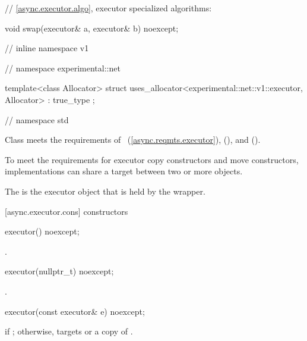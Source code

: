 \begin{codeblock}
{{{  // \ref{async.executor.algo}, executor specialized algorithms:

  void swap(executor& a, executor& b) noexcept;

} // inline namespace v1
} // namespace experimental::net

  template<class Allocator>
    struct uses_allocator<experimental::net::v1::executor, Allocator>
      : true_type {};

} // namespace std
\end{codeblock}

\pnum
Class  meets the requirements of ~(\ref{async.reqmts.executor}),  (), and  ().

\pnum
\begin{note} To meet the  requirements for executor copy constructors and move constructors, implementations can share a target between two or more  objects. \end{note}

\pnum
The  is the executor object that is held by the wrapper.


[async.executor.cons]{ constructors}

%
\begin{itemdecl}
executor() noexcept;
\end{itemdecl}

\begin{itemdescr}
\pnum
\postconditions {}.
\end{itemdescr}

%
\begin{itemdecl}
executor(nullptr_t) noexcept;
\end{itemdecl}

\begin{itemdescr}
\pnum
\postconditions {}.
\end{itemdescr}

%
\begin{itemdecl}
executor(const executor& e) noexcept;
\end{itemdecl}

\begin{itemdescr}
\pnum
\postconditions {} if ; otherwise,  targets  or a copy of .
\end{itemdescr}

